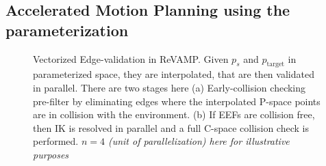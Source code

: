 \documentclass[letterpaper, 10 pt, conference]{ieeeconf}
\begin{document}

\subsection{Accelerated Motion Planning using the parameterization}

\begin{figure} 
    
    \vspace{-1em}
    \caption{Vectorized Edge-validation in ReVAMP. Given $p_s$ and $p_\text{target}$ in parameterized space, they are interpolated, that are then validated in parallel. There are two stages here (a) Early-collision checking pre-filter by eliminating edges where the interpolated P-space points are in collision with the environment. (b) If EEFs are collision free, then IK is resolved in parallel and a full C-space collision check is performed. \textit{$n=4$ (unit of parallelization) here for illustrative purposes}}
\label{fig:methodology}
\end{figure}
\end{document}
